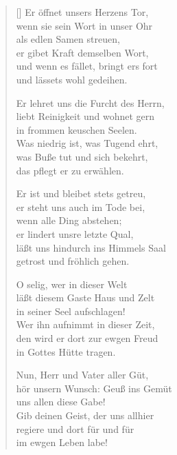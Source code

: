 \begin{multicols}{2}
\begin{verse}[\versewidth]
 Er öffnet unsers Herzens Tor,\\
wenn sie sein Wort in unser Ohr\\
als edlen Samen streuen,\\
er gibet Kraft demselben Wort,\\
und wenn es fället, bringt ers fort\\
und lässets wohl gedeihen.

 Er lehret uns die Furcht des Herrn,\\
liebt Reinigkeit und wohnet gern\\
in frommen keuschen Seelen.\\
Was niedrig ist, was Tugend ehrt,\\
was Buße tut und sich bekehrt,\\
das pflegt er zu erwählen.

 Er ist und bleibet stets getreu,\\
er steht uns auch im Tode bei,\\
wenn alle Ding abstehen;\\
er lindert unsre letzte Qual,\\
läßt uns hindurch ins Himmels Saal\\
getrost und fröhlich gehen.

 O selig, wer in dieser Welt\\
läßt diesem Gaste Haus und Zelt\\
in seiner Seel aufschlagen!\\
Wer ihn aufnimmt in dieser Zeit,\\
den wird er dort zur ewgen Freud\\
in Gottes Hütte tragen.

 Nun, Herr und Vater aller Güt,\\
hör unsern Wunsch: Geuß ins Gemüt\\
uns allen diese Gabe!\\
Gib deinen Geist, der uns allhier\\
regiere und dort für und für\\
im ewgen Leben labe!

\end{verse}
\end{multicols}
